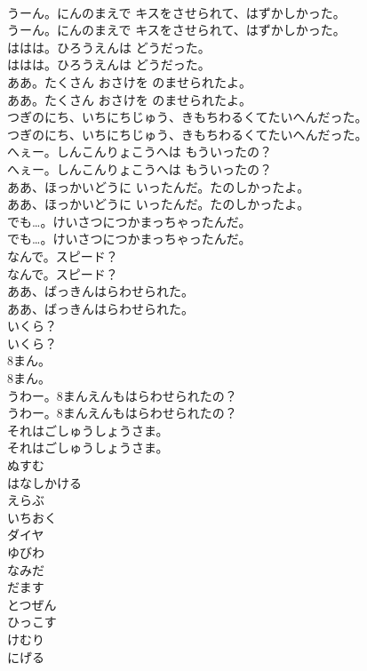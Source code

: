 \documentclass[8pt]{extreport}
\begin{document}
\begin{CJK}{UTF8}{min}
\\	うーん。にんのまえで キスをさせられて、はずかしかった。
\\	うーん。にんのまえで キスをさせられて、はずかしかった。
\\	ははは。ひろうえんは どうだった。
\\	ははは。ひろうえんは どうだった。
\\	ああ。たくさん おさけを のませられたよ。
\\	ああ。たくさん おさけを のませられたよ。
\\	つぎのにち、いちにちじゅう、きもちわるくてたいへんだった。
\\	つぎのにち、いちにちじゅう、きもちわるくてたいへんだった。
\\	へぇー。しんこんりょこうへは もういったの？
\\	へぇー。しんこんりょこうへは もういったの？
\\	ああ、ほっかいどうに いったんだ。たのしかったよ。
\\	ああ、ほっかいどうに いったんだ。たのしかったよ。
\\	でも…。けいさつにつかまっちゃったんだ。
\\	でも…。けいさつにつかまっちゃったんだ。
\\	なんで。スピード？
\\	なんで。スピード？
\\	ああ、ばっきんはらわせられた。
\\	ああ、ばっきんはらわせられた。
\\	いくら？
\\	いくら？
\\	8まん。
\\	8まん。
\\	うわー。8まんえんもはらわせられたの？
\\	うわー。8まんえんもはらわせられたの？
\\	それはごしゅうしょうさま。
\\	それはごしゅうしょうさま。
\\	ぬすむ
\\	はなしかける
\\	えらぶ
\\	いちおく
\\	ダイヤ
\\	ゆびわ
\\	なみだ
\\	だます
\\	とつぜん
\\	ひっこす
\\	けむり
\\	にげる

\end{CJK}
\end{document}
